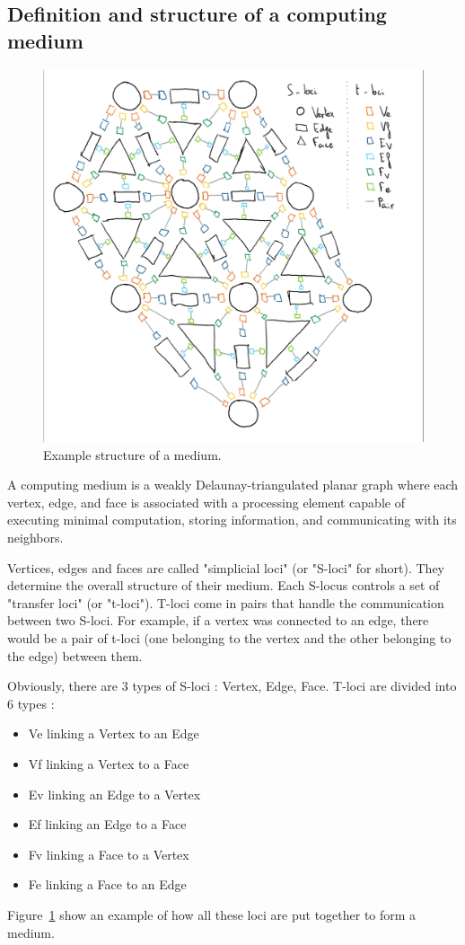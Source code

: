 \documentclass{article}
\begin{document}
\subsection{Definition and structure of a computing medium}

\begin{figure}[H]
	\centering\includegraphics[width=0.9\linewidth]{assets/handdrawn_medium.png}
	\caption{Example structure of a medium.}
	\label{fig:example_structure}
\end{figure}

A computing medium is a weakly Delaunay-triangulated planar graph where each vertex, edge, and face is associated with a processing element capable of executing minimal computation, storing information, and communicating with its neighbors.

Vertices, edges and faces are called "simplicial loci" (or "S-loci" for short). They determine the overall structure of their medium. Each S-locus controls a set of "transfer loci" (or "t-loci"). T-loci come in pairs that handle the communication between two S-loci. For example, if a vertex was connected to an edge, there would be a pair of t-loci (one belonging to the vertex and the other belonging to the edge) between them.

Obviously, there are 3 types of S-loci : Vertex, Edge, Face. T-loci are divided into 6 types : 
\begin{itemize}[noitemsep,nosep]
	\item Ve linking a  Vertex to an Edge
	\item Vf linking a  Vertex to a  Face
	\item Ev linking an Edge   to a  Vertex
	\item Ef linking an Edge   to a  Face
	\item Fv linking a  Face   to a  Vertex
	\item Fe linking a  Face   to an Edge
\end{itemize}
Figure~\ref{fig:example_structure} show an example of how all these loci are put together to form a medium.
\end{document}
